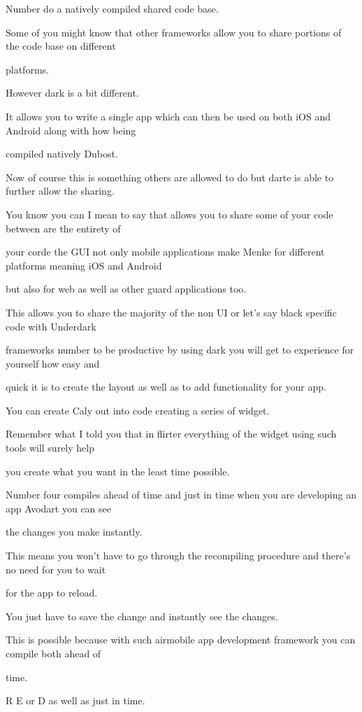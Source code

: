 Number do a natively compiled shared code base.

Some of you might know that other frameworks allow you to share portions of the code base on different

platforms.

However dark is a bit different.

It allows you to write a single app which can then be used on both iOS and Android along with how being

compiled natively Dubost.

Now of course this is something others are allowed to do but darte is able to further allow the sharing.

You know you can I mean to say that allows you to share some of your code between are the entirety of

your corde the GUI not only mobile applications make Menke for different platforms meaning iOS and Android

but also for web as well as other guard applications too.

This allows you to share the majority of the non UI or let's say black specific code with Underdark

frameworks number to be productive by using dark you will get to experience for yourself how easy and

quick it is to create the layout as well as to add functionality for your app.

You can create Caly out into code creating a series of widget.

Remember what I told you that in flirter everything of the widget using such tools will surely help

you create what you want in the least time possible.

Number four compiles ahead of time and just in time when you are developing an app Avodart you can see

the changes you make instantly.

This means you won't have to go through the recompiling procedure and there's no need for you to wait

for the app to reload.

You just have to save the change and instantly see the changes.

This is possible because with such airmobile app development framework you can compile both ahead of

time.

R E or D as well as just in time.

